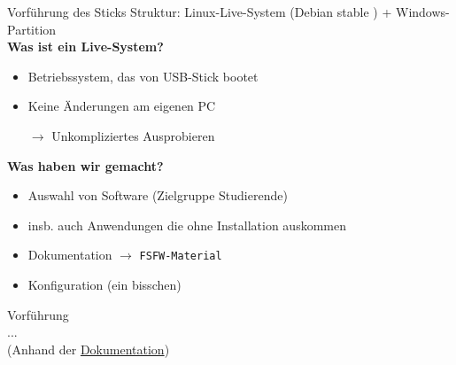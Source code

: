 \documentclass[t]{beamer}
\begin{document}

\begin{frame}[label=ct3]{\color{fg}Vorführung des Sticks}
Struktur: Linux-Live-System (Debian stable ) + Windows-Partition\\[3mm]

\textbf{Was ist ein Live-System?}
\begin{itemize}
  \item Betriebssystem, das von USB-Stick bootet
  \item[]
  \item Keine Änderungen am eigenen PC
  \item[$\rightarrow$] Unkompliziertes Ausprobieren
  \item[]
  \end{itemize}

\pause  
\textbf{Was haben wir gemacht?}
  \begin{itemize}
  \item Auswahl von Software (Zielgruppe Studierende)
  \item insb. auch Anwendungen die ohne Installation auskommen
  \item Dokumentation $\rightarrow$ \texttt{FSFW-Material}
  \item Konfiguration (ein bisschen)
  \end{itemize}  
 
\end{frame}




\begin{frame}[label=ct4]{\color{fg}{}}
 \vspace{20mm}

\begin{center}
Vorführung\\ ... \\[10mm]

{\tiny (Anhand der \href{https://github.com/fsfw-dresden/usb-live-linux/blob/master/doc/src/index.md}{Dokumentation})}



\end{center}
\end{frame}

\end{document}
